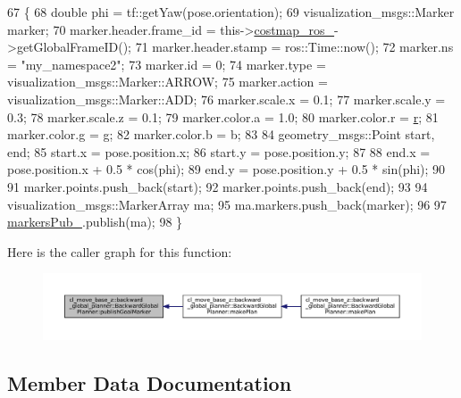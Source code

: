 \begin{DoxyCode}
67 \{
68     \textcolor{keywordtype}{double} phi = tf::getYaw(pose.orientation);
69     visualization\_msgs::Marker marker;
70     marker.header.frame\_id = this->\hyperlink{classcl__move__base__z_1_1backward__global__planner_1_1BackwardGlobalPlanner_a7103c15e6540a514acd421c3c6e194a4}{costmap\_ros\_}->getGlobalFrameID();
71     marker.header.stamp = ros::Time::now();
72     marker.ns = \textcolor{stringliteral}{"my\_namespace2"};
73     marker.id = 0;
74     marker.type = visualization\_msgs::Marker::ARROW;
75     marker.action = visualization\_msgs::Marker::ADD;
76     marker.scale.x = 0.1;
77     marker.scale.y = 0.3;
78     marker.scale.z = 0.1;
79     marker.color.a = 1.0;
80     marker.color.r = \hyperlink{namespacefake__cube__perception__node_a36e88703ab69fd35065e8a8d9344903e}{r};
81     marker.color.g = g;
82     marker.color.b = b;
83 
84     geometry\_msgs::Point start, end;
85     start.x = pose.position.x;
86     start.y = pose.position.y;
87 
88     end.x = pose.position.x + 0.5 * cos(phi);
89     end.y = pose.position.y + 0.5 * sin(phi);
90 
91     marker.points.push\_back(start);
92     marker.points.push\_back(end);
93 
94     visualization\_msgs::MarkerArray ma;
95     ma.markers.push\_back(marker);
96 
97     \hyperlink{classcl__move__base__z_1_1backward__global__planner_1_1BackwardGlobalPlanner_a6f80f7041c8cdc93e1f3dfd0e723654a}{markersPub\_}.publish(ma);
98 \}
\end{DoxyCode}
Here is the caller graph for this function\+:
\nopagebreak
\begin{figure}[H]
\begin{center}
\leavevmode
\includegraphics[width=350pt]{classcl__move__base__z_1_1backward__global__planner_1_1BackwardGlobalPlanner_a3c6784cad10fdadf28323380fe3d6d2b_icgraph}
\end{center}
\end{figure}


\subsection{Member Data Documentation}
\mbox{\label{classcl__move__base__z_1_1backward__global__planner_1_1BackwardGlobalPlanner_a7103c15e6540a514acd421c3c6e194a4}} 
